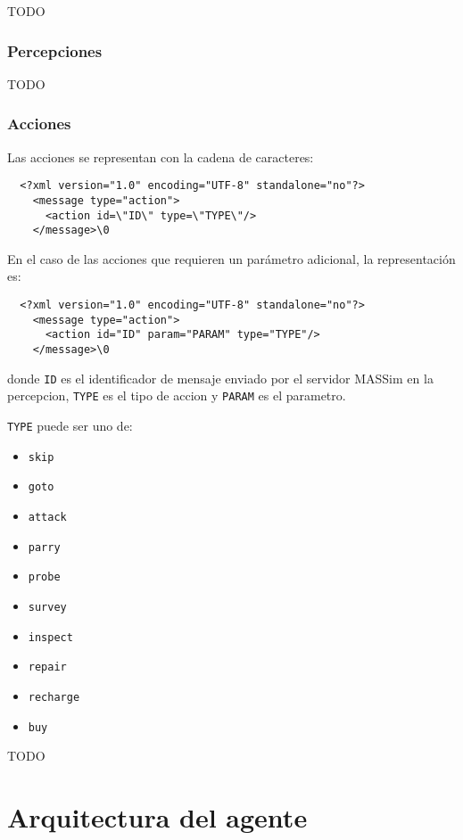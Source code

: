  TODO

\subsubsection{Percepciones}
\label{subsub:percepciones}

 TODO

\subsubsection{Acciones}
\label{subsub:acciones}

  Las acciones se representan con la cadena de caracteres:
  
  \begin{verbatim}
  <?xml version="1.0" encoding="UTF-8" standalone="no"?>
    <message type="action">
      <action id=\"ID\" type=\"TYPE\"/>
    </message>\0
  \end{verbatim}
  
  En el caso de las acciones que requieren un parámetro adicional, la
  representación es:
  
  \begin{verbatim}
  <?xml version="1.0" encoding="UTF-8" standalone="no"?>
    <message type="action">
      <action id="ID" param="PARAM" type="TYPE"/>
    </message>\0
  \end{verbatim}
  
  donde {\tt ID} es el identificador de mensaje enviado por el servidor
  MASSim en la percepcion, {\tt TYPE} es el tipo de accion y {\tt PARAM}
  es el parametro. 
  
  {\tt TYPE} puede ser uno de:
  
  \begin{itemize}
  \item \tt{skip}
  \item \tt{goto}
  \item \tt{attack}
  \item \tt{parry}
  \item \tt{probe}
  \item \tt{survey}
  \item \tt{inspect}
  \item \tt{repair}
  \item \tt{recharge}
  \item \tt{buy}
  \end{itemize}

 TODO

\section{Arquitectura del agente}
\label{sec:arquitectura_agente}


